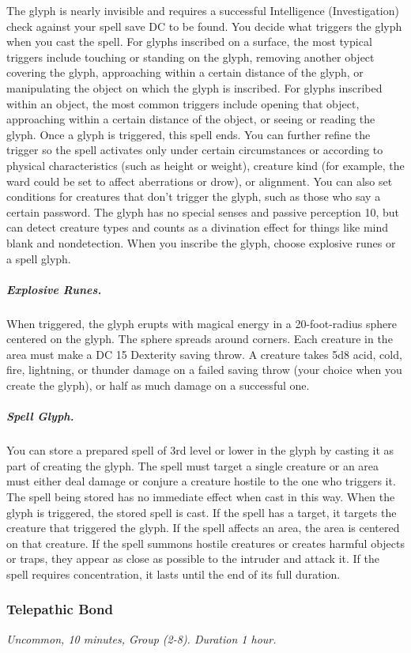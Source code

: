 The glyph is nearly invisible and requires a successful Intelligence (Investigation) check against your spell save DC to be found.
You decide what triggers the glyph when you cast the spell. For glyphs inscribed on a surface, the most typical triggers include touching or standing on the glyph, removing another object covering the glyph, approaching within a certain distance of the glyph, or manipulating the object on which the glyph is inscribed. For glyphs inscribed within an object, the most common triggers include opening that object, approaching within a certain distance of the object, or seeing or reading the glyph. Once a glyph is triggered, this spell ends.
You can further refine the trigger so the spell activates only under certain circumstances or according to physical characteristics (such as height or weight), creature kind (for example, the ward could be set to affect aberrations or drow), or alignment. You can also set conditions for creatures that don't trigger the glyph, such as those who say a certain password. The glyph has no special senses and passive perception 10, but can detect creature types and counts as a divination effect for things like mind blank and nondetection.
When you inscribe the glyph, choose explosive runes or a spell glyph.

\subparagraph*{Explosive Runes.} When triggered, the glyph erupts with magical energy in a 20-foot-radius sphere centered on the glyph. The sphere spreads around corners. Each creature in the area must make a DC 15 Dexterity saving throw. A creature takes 5d8 acid, cold, fire, lightning, or thunder damage on a failed saving throw (your choice when you create the glyph), or half as much damage on a successful one.

\subparagraph*{Spell Glyph.} You can store a prepared spell of 3rd level or lower in the glyph by casting it as part of creating the glyph. The spell must target a single creature or an area must either deal damage or conjure a creature hostile to the one who triggers it. The spell being stored has no immediate effect when cast in this way. When the glyph is triggered, the stored spell is cast. If the spell has a target, it targets the creature that triggered the glyph. If the spell affects an area, the area is centered on that creature. If the spell summons hostile creatures or creates harmful objects or traps, they appear as close as possible to the intruder and attack it. If the spell requires concentration, it lasts until the end of its full duration.

\subsubsection{Telepathic Bond}
\textit{Uncommon, 10 minutes, Group (2-8). Duration 1 hour.}

